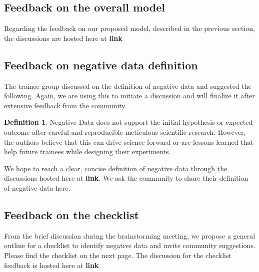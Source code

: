 \documentclass[9pt,lessons]{livecoms}
\theoremstyle{definition}
\newtheorem{definition}{Definition}[section]
\theoremstyle{remark}
\begin{document}
\subsection {Feedback on the overall model}
Regarding the feedback on our proposed model, described in the previous section, the discussions are hosted here at \textbf{link}

\subsection {Feedback on negative data definition}
The trainee group discussed on the definition of negative data and suggested the following.
Again, we are using this to initiate a discussion and will finalize it after extensive feedback from the community.

\begin{definition}
Negative Data does not support the initial hypothesis or expected outcome after careful and reproducible meticulous scientific research.
However, the authors believe that this can drive science forward or are lessons learned that help future trainees while designing their experiments.  
\end{definition}

We hope to reach a clear, concise definition of negative data through the discussions hosted here at \textbf{link}.
We ask the community to share their definition of negative data here.

\subsection{Feedback on the checklist}

From the brief discussion during the brainstorming meeting, we propose a general outline for a checklist to identify negative data and invite community suggestions.
Please find the checklist on the next page.
The discussion for the checklist feedback is hosted here at \textbf{link}
\end{document}
